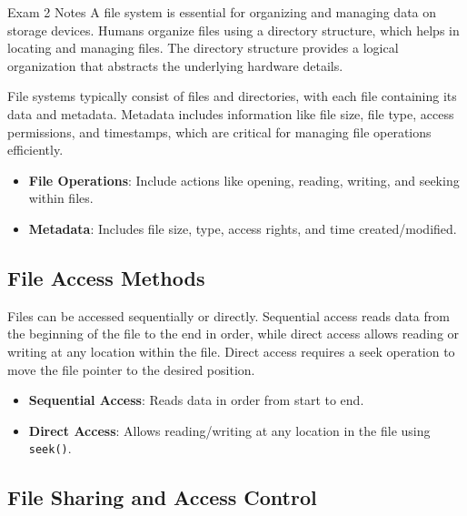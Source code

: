 \begin{examnotes}{Exam 2 Notes}
    A file system is essential for organizing and managing data on storage devices. Humans organize files using a directory structure, which helps in locating and managing files. The directory structure 
    provides a logical organization that abstracts the underlying hardware details.
    
    File systems typically consist of files and directories, with each file containing its data and metadata. Metadata includes information like file size, file type, access permissions, and timestamps, 
    which are critical for managing file operations efficiently.
    
    \begin{highlight}
        \begin{itemize}
            \item \textbf{File Operations}: Include actions like opening, reading, writing, and seeking within files.
            \item \textbf{Metadata}: Includes file size, type, access rights, and time created/modified.
        \end{itemize}
    \end{highlight}
    
    \subsection*{File Access Methods}
    
    Files can be accessed sequentially or directly. Sequential access reads data from the beginning of the file to the end in order, while direct access allows reading or writing at any location within 
    the file. Direct access requires a seek operation to move the file pointer to the desired position.
    
    \begin{highlight}
        \begin{itemize}
            \item \textbf{Sequential Access}: Reads data in order from start to end.
            \item \textbf{Direct Access}: Allows reading/writing at any location in the file using \texttt{seek()}.
        \end{itemize}
    \end{highlight}
    
    \subsection*{File Sharing and Access Control}
    

\end{examnotes}
